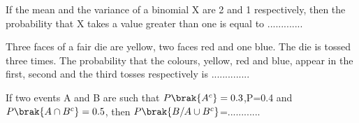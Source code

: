     \item If the mean and the variance of a binomial X are 2 and 1 respectively, then the probability that X takes a value greater than one is equal to .............\hfill{}\\ 
    \item Three faces of a fair die are yellow, two faces red and one blue. The die is tossed three times. The probability that the colours, yellow, red and blue, appear in the first, second and the third tosses  respectively is ..............\hfill{}\\
    \item If two events A and B are such that $P\brak{A^{c}}=0.3$,P=0.4 and $P\brak{A \cap B^{c}}=0.5$, then $P\brak{B/A \cup B^{c}}$=............ \hfill{}\\\\

